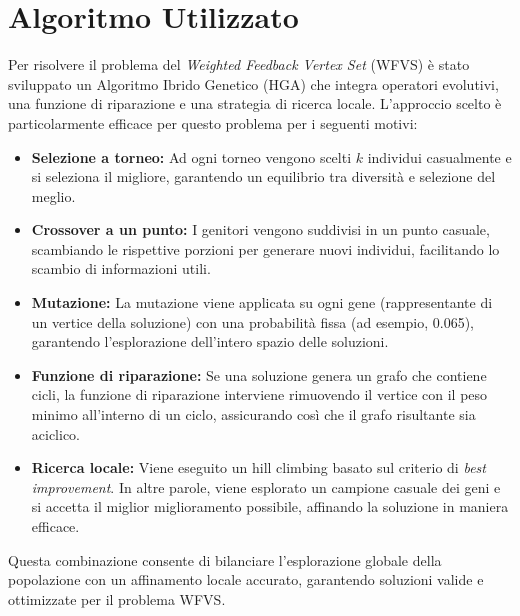 \documentclass[a4paper,12pt]{article}
\begin{document}
\section{Algoritmo Utilizzato}

Per risolvere il problema del \emph{Weighted Feedback Vertex Set} (WFVS) è stato sviluppato un Algoritmo Ibrido Genetico (HGA) che integra operatori evolutivi, una funzione di riparazione e una strategia di ricerca locale. L'approccio scelto è particolarmente efficace per questo problema per i seguenti motivi:

\begin{itemize}
    \item \textbf{Selezione a torneo:} Ad ogni torneo vengono scelti $k$ individui casualmente e si seleziona il migliore, garantendo un equilibrio tra diversità e selezione del meglio.
    \item \textbf{Crossover a un punto:} I genitori vengono suddivisi in un punto casuale, scambiando le rispettive porzioni per generare nuovi individui, facilitando lo scambio di informazioni utili.
    \item \textbf{Mutazione:} La mutazione viene applicata su ogni gene (rappresentante di un vertice della soluzione) con una probabilità fissa (ad esempio, 0.065), garantendo l'esplorazione dell'intero spazio delle soluzioni.
    \item \textbf{Funzione di riparazione:} Se una soluzione genera un grafo che contiene cicli, la funzione di riparazione interviene rimuovendo il vertice con il peso minimo all'interno di un ciclo, assicurando così che il grafo risultante sia aciclico.
    \item \textbf{Ricerca locale:} Viene eseguito un hill climbing basato sul criterio di \emph{best improvement}. In altre parole, viene esplorato un campione casuale dei geni e si accetta il miglior miglioramento possibile, affinando la soluzione in maniera efficace.
\end{itemize}

Questa combinazione consente di bilanciare l'esplorazione globale della popolazione con un affinamento locale accurato, garantendo soluzioni valide e ottimizzate per il problema WFVS.
\end{document}
